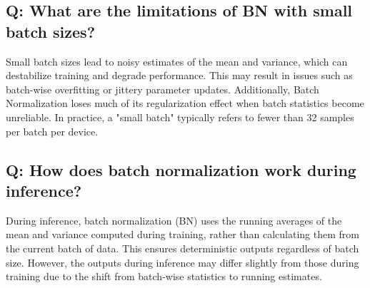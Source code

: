 \documentclass[11pt]{article}
\begin{document}
\subsection*{Q: What are the limitations of BN with small batch sizes?}
Small batch sizes lead to noisy estimates of the mean and variance, which can destabilize training and degrade performance. This may result in issues such as batch-wise overfitting or jittery parameter updates. Additionally, Batch Normalization loses much of its regularization effect when batch statistics become unreliable. In practice, a "small batch" typically refers to fewer than 32 samples per batch per device.

\subsection*{Q: How does batch normalization work during inference?}
During inference, batch normalization (BN) uses the running averages of the mean and variance computed during training, rather than calculating them from the current batch of data. This ensures deterministic outputs regardless of batch size. However, the outputs during inference may differ slightly from those during training due to the shift from batch-wise statistics to running estimates.
\end{document}
